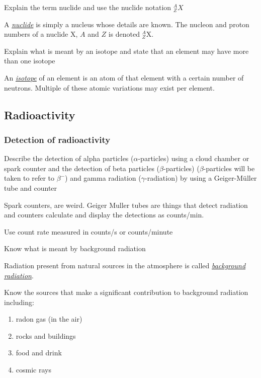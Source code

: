 \begin{subpoint}
Explain the term nuclide and use the nuclide notation $^A_Z X$
\end{subpoint}

A \emph{\ul{nuclide}} is simply a nucleus whose details are known. The nucleon and
proton numbers of a nuclide X, $A$ and $Z$ is denoted $^A_Z$X.

\begin{subpoint}
Explain what is meant by an isotope and state that an element may have more than one isotope
\end{subpoint}

An \emph{\ul{isotope}} of an element is an atom of that element with a certain number
of neutrons. Multiple of these atomic variations may exist per element.

\subsection{Radioactivity}
\subsubsection{Detection of radioactivity}

\begin{subpoint}
Describe the detection of alpha particles ($\alpha$-particles) using a cloud chamber or spark counter and the
detection of beta particles ($\beta$-particles) ($\beta$-particles will be taken to refer to $\beta^-$) and gamma radiation
($\gamma$-radiation) by using a Geiger-Müller tube and counter
\end{subpoint}

Spark counters, are weird. Geiger Muller tubes are things that detect radiation and
counters calculate and display the detections as counts/min.

\begin{subpoint}
Use count rate measured in counts/s or counts/minute
\end{subpoint}

\begin{subpoint}
Know what is meant by background radiation
\end{subpoint}

Radiation present from natural sources in the atmosphere is called \emph{\ul{background
radiation}}.

\begin{subpoint}
Know the sources that make a significant contribution to background radiation including:
\begin{enumerate}[label=(\alph*)]
	\setlength\itemsep{0em}
	\item radon gas (in the air)
	\item rocks and buildings
	\item food and drink
	\item cosmic rays
\end{enumerate}
\end{subpoint}

